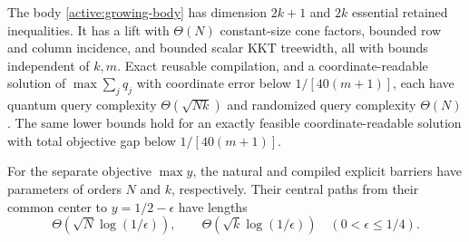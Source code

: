 \begin{proposition}
\label{active:growing}
The body \eqref{active:growing-body} has dimension $2k+1$ and
$2k$ essential retained inequalities. It has a lift with $\Theta(N)$
constant-size cone factors, bounded row and column incidence, and
bounded scalar KKT treewidth, all with bounds independent of $k,m$.
Exact reusable compilation, and a coordinate-readable solution
of $\max\sum_jq_j$ with coordinate error below $1/[40(m+1)]$, each
have quantum query complexity $\Theta(\sqrt{Nk})$ and randomized query
complexity $\Theta(N)$. The same lower bounds hold for
an exactly feasible coordinate-readable solution with total objective
gap below $1/[40(m+1)]$.

For the separate objective $\max y$, the natural and compiled
explicit barriers have parameters of orders $N$ and $k$, respectively.
Their central paths from their common center to $y=1/2-\epsilon$ have
lengths
\[
 \Theta\!\left(\sqrt N\log(1/\epsilon)\right),\qquad
 \Theta\!\left(\sqrt k\log(1/\epsilon)\right)
 \quad(0<\epsilon\leq1/4).
\]
\end{proposition}

